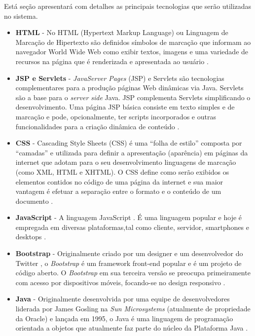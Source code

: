 \documentclass[a4paper,12pt]{monografia}
\begin{document}
Está seção apresentará com detalhes as principais tecnologias que serão utilizadas no sistema.

\begin{itemize}
\item \textbf{HTML} - No HTML (Hypertext Markup Language) ou Linguagem de Marcação de Hipertexto são definidos símbolos de marcação que informam ao navegador World Wide Web como exibir textos, imagens e uma variedade de recursos na página que é renderizada e apresentada ao usuário \cite{html}.

\item \textbf{JSP e Servlets} - \textit{JavaServer Pages} (JSP) e Servlets são tecnologias complementares para a produção páginas Web dinâmicas via Java. Servlets são a base para o \textit{server side} Java. JSP complementa Servlets  simplificando o desenvolvimento. Uma página JSP básica consiste em texto simples e de marcação e pode, opcionalmente, ter scripts incorporados e outras funcionalidades para a criação dinâmica de conteúdo \cite{jsp2007java}.

\item \textbf{CSS} - Cascading Style Sheets (CSS) é uma “folha de estilo” composta por “camadas” e utilizada para definir a apresentação (aparência) em páginas da internet que adotam para o seu desenvolvimento linguagens de marcação (como XML, HTML e XHTML). O CSS define como serão exibidos os elementos contidos no código de uma página da internet e sua maior vantagem é efetuar a separação entre o formato e o conteúdo de um documento \cite{anapereira}.

\item \textbf{JavaScript} - A linguagem JavaScript \cite{goodman}. É uma linguagem popular e hoje é empregada em diversas plataformas,tal como cliente, servidor, smartphones e desktops \cite{stefanov}.

\item \textbf{Bootstrap} - Originalmente criado por um designer e um desenvolvedor do Twitter \citeyear{twitter}, o \textit{Bootstrap} é um framework front-end popular e é um projeto de código aberto. O \textit{Bootstrap} em sua terceira versão se preocupa primeiramente com acesso por dispositivos móveis, focando-se no design responsivo \cite{bootstrap}.

\item \textbf{Java} - Originalmente desenvolvida por uma equipe de desenvolvedores liderada por James Gosling na \textit{Sun Microsystems} (atualmente de propriedade da Oracle) e lançada em 1995, o Java é uma linguagem de programação orientada a objetos que atualmente faz parte do núcleo da Plataforma Java \cite{java}.


\end{itemize}
\end{document}
